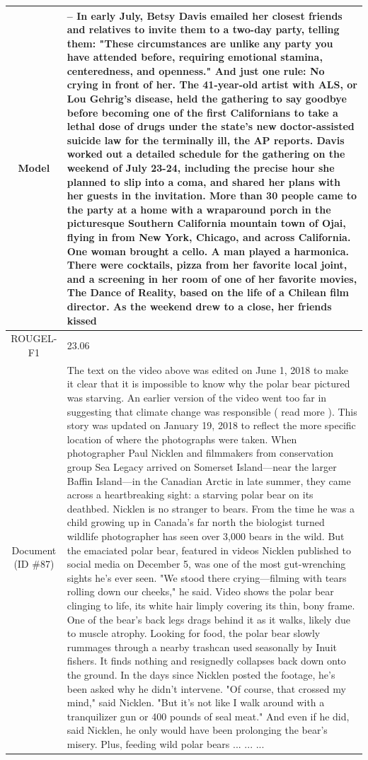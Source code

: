 \begin{table}[bth!]
\begin{tabular}{c|p{}}
\\ \hline
Model & 
– In early July, Betsy Davis emailed her closest friends and relatives to invite them to a two-day party, telling them: "These circumstances are unlike any party you have attended before, requiring emotional stamina, centeredness, and openness." And just one rule: No crying in front of her. The 41-year-old artist with ALS, or Lou Gehrig's disease, held the gathering to say goodbye before becoming one of the first Californians to take a lethal dose of drugs under the state's new doctor-assisted suicide law for the terminally ill, the AP reports. Davis worked out a detailed schedule for the gathering on the weekend of July 23-24, including the precise hour she planned to slip into a coma, and shared her plans with her guests in the invitation. More than 30 people came to the party at a home with a wraparound porch in the picturesque Southern California mountain town of Ojai, flying in from New York, Chicago, and across California. One woman brought a cello. A man played a harmonica. There were cocktails, pizza from her favorite local joint, and a screening in her room of one of her favorite movies, The Dance of Reality, based on the life of a Chilean film director. As the weekend drew to a close, her friends kissed
\\ \hline
ROUGEL-F1 & 
23.06
\\ \hline
\makecell{Document\\(ID \#87)} & 
The text on the video above was edited on June 1, 2018 to make it clear that it is impossible to know why the polar bear pictured was starving. An earlier version of the video went too far in suggesting that climate change was responsible ( read more ). This story was updated on January 19, 2018 to reflect the more specific location of where the photographs were taken. When photographer Paul Nicklen and filmmakers from conservation group Sea Legacy arrived on Somerset Island—near the larger Baffin Island—in the Canadian Arctic in late summer, they came across a heartbreaking sight: a starving polar bear on its deathbed. Nicklen is no stranger to bears. From the time he was a child growing up in Canada's far north the biologist turned wildlife photographer has seen over 3,000 bears in the wild. But the emaciated polar bear, featured in videos Nicklen published to social media on December 5, was one of the most gut-wrenching sights he's ever seen. "We stood there crying—filming with tears rolling down our cheeks," he said. Video shows the polar bear clinging to life, its white hair limply covering its thin, bony frame. One of the bear's back legs drags behind it as it walks, likely due to muscle atrophy. Looking for food, the polar bear slowly rummages through a nearby trashcan used seasonally by Inuit fishers. It finds nothing and resignedly collapses back down onto the ground. In the days since Nicklen posted the footage, he's been asked why he didn’t intervene. "Of course, that crossed my mind," said Nicklen. "But it's not like I walk around with a tranquilizer gun or 400 pounds of seal meat." And even if he did, said Nicklen, he only would have been prolonging the bear's misery. Plus, feeding wild polar bears ... ... ... 

\end{tabular}
\end{table}
